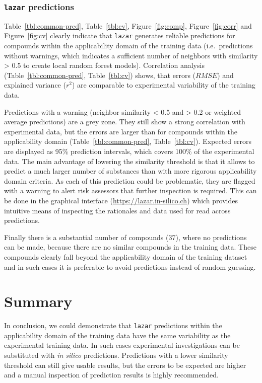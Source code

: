 \documentclass[]{achemso}
\begin{document}
\subsubsection{\texorpdfstring{\texttt{lazar}
predictions}{lazar predictions}}\label{lazar-predictions}

Table~\ref{tbl:common-pred}, Table~\ref{tbl:cv}, Figure~\ref{fig:comp},
Figure~\ref{fig:corr} and Figure~\ref{fig:cv} clearly indicate that
\texttt{lazar} generates reliable predictions for compounds within the
applicability domain of the training data (i.e.~predictions without
warnings, which indicates a sufficient number of neighbors with
similarity \textgreater{} 0.5 to create local random forest models).
Correlation analysis (Table~\ref{tbl:common-pred}, Table~\ref{tbl:cv})
shows, that errors (\(RMSE\)) and explained variance (\(r^2\)) are
comparable to experimental variability of the training data.

Predictions with a warning (neighbor similarity \textless{} 0.5 and
\textgreater{} 0.2 or weighted average predictions) are a grey zone.
They still show a strong correlation with experimental data, but the
errors are larger than for compounds within the applicability domain
(Table~\ref{tbl:common-pred}, Table~\ref{tbl:cv}). Expected errors are
displayed as 95\% prediction intervals, which covers 100\% of the
experimental data. The main advantage of lowering the similarity
threshold is that it allows to predict a much larger number of
substances than with more rigorous applicability domain criteria. As
each of this prediction could be problematic, they are flagged with a
warning to alert risk assessors that further inspection is required.
This can be done in the graphical interface
(\url{https://lazar.in-silico.ch}) which provides intuitive means of
inspecting the rationales and data used for read across predictions.

Finally there is a substantial number of compounds (37), where no
predictions can be made, because there are no similar compounds in the
training data. These compounds clearly fall beyond the applicability
domain of the training dataset and in such cases it is preferable to
avoid predictions instead of random guessing.

\section{Summary}\label{summary}

In conclusion, we could demonstrate that \texttt{lazar} predictions
within the applicability domain of the training data have the same
variability as the experimental training data. In such cases
experimental investigations can be substituted with \emph{in silico}
predictions. Predictions with a lower similarity threshold can still
give usable results, but the errors to be expected are higher and a
manual inspection of prediction results is highly recommended.
\end{document}

